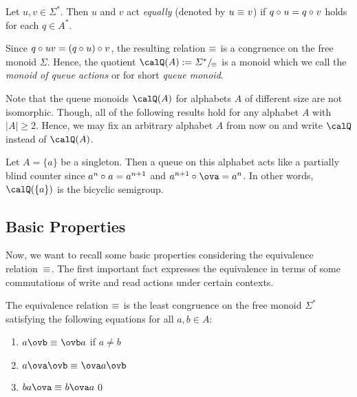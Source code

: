 \begin{definition}
	Let $u,v\in\varSigma^*$. Then $u$ and $v$ act \emph{equally} (denoted by ${u\equiv_{} v}$) if $q\circ_{} u=q\circ_{} v$ holds for each $q\in A^*$.
	
	Since $q\circ_{} uv=(q\circ_{} u)\circ_{} v$, the resulting relation $\equiv_{}$
	is a congruence on the free monoid $\varSigma$. Hence, the
	quotient $\Qx(A):=\partition{\varSigma^*}{\equivx}$ is a monoid
	which we call the \emph{monoid of queue actions} or for short \emph{queue monoid}.
\end{definition}

Note that the queue monoids $\Qx(A)$ for alphabets $A$ of different size are not isomorphic. Though, all of the following results hold for any alphabet $A$ with $|A|\geq2$. Hence, we may fix an arbitrary alphabet $A$ from now on and write $\Qx$ instead of $\Qx(A)$.

\begin{remark}
	Let $A=\{a\}$ be a singleton. Then a queue on this alphabet acts like a partially blind counter since $a^n\circ_{} a=a^{n+1}$ and $a^{n+1}\opx\ova=a^n$. In other words, $\Qx(\{a\})$ is the bicyclic semigroup.
\end{remark}

\subsection{Basic Properties}
Now, we want to recall some basic properties considering the equivalence relation~$\equiv_{}$. The first important fact expresses the equivalence in terms of some commutations of write and read actions under certain contexts.

\begin{theorem}\label{thm:equiv}
	The equivalence relation $\equiv_{}$ is the least congruence on the free monoid $\varSigma^*$ satisfying the following equations for all $a,b\in A$:
	\begin{enumerate}[(1)]
		\item $a\ovb\equivx\ovb a$ if $a\neq b$\label{thm:equiv:i1}
		\item $a\ova\ovb\equivx\ova a\ovb$\label{thm:equiv:i2}
		\item $ba\ova\equivx b\ova a$\label{thm:equiv:i3}\qed
	\end{enumerate}
\end{theorem}

